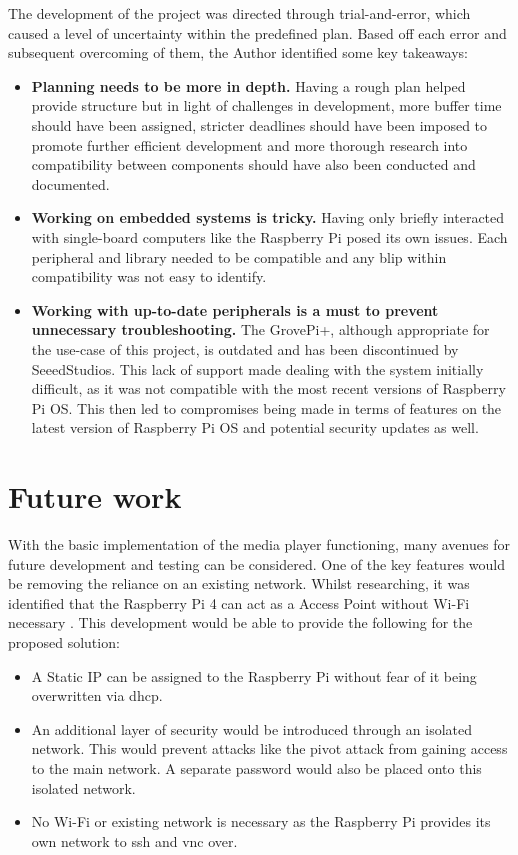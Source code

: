 The development of the project was directed through trial-and-error, which caused a level of uncertainty within the predefined plan. Based off each error and subsequent overcoming of them, the Author identified some key takeaways:
\begin{itemize}
    \item \textbf{Planning needs to be more in depth.} Having a rough plan helped provide structure but in light of challenges in development, more buffer time should have been assigned, stricter deadlines should have been imposed to promote further efficient development and more thorough research into compatibility between components should have also been conducted and documented.
    \item \textbf{Working on embedded systems is tricky.} Having only briefly interacted with single-board computers like the Raspberry Pi posed its own issues. Each peripheral and library needed to be compatible and any blip within compatibility was not easy to identify.
    \item \textbf{Working with up-to-date peripherals is a must to prevent unnecessary troubleshooting.} The GrovePi+, although appropriate for the use-case of this project, is outdated and has been discontinued by SeeedStudios. This lack of support made dealing with the system initially difficult, as it was not compatible with the most recent versions of Raspberry Pi OS. This then led to compromises being made in terms of features on the latest version of Raspberry Pi OS and potential security updates as well.
\end{itemize}

\section{Future work}\label{sec:future}
With the basic implementation of the media player functioning, many avenues for future development and testing can be considered. One of the key features would be removing the reliance on an existing network. Whilst researching, it was identified that the Raspberry Pi 4 can act as a Access Point without Wi-Fi necessary \citep{excynimphica2024}. This development would be able to provide the following for the proposed solution:
\begin{itemize}
    \item A Static IP can be assigned to the Raspberry Pi without fear of it being overwritten via \gls{dhcp}.
    \item An additional layer of security would be introduced through an isolated network. This would prevent attacks like the pivot attack from gaining access to the main network. A separate password would also be placed onto this isolated network.
    \item No Wi-Fi or existing network is necessary as the Raspberry Pi provides its own network to \gls{ssh} and \gls{vnc} over.
\end{itemize}

